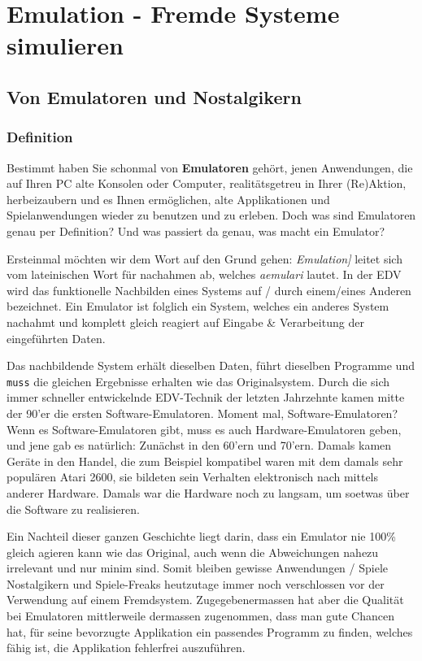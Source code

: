 \documentclass[b5paper,10pt,dvips,fleqn,titlepage,twoside]{book}
\begin{document}
\part{Emulation - Fremde Systeme simulieren}
\chapter{Von Emulatoren und Nostalgikern}
\section{Definition}
Bestimmt haben Sie schonmal von \textbf{Emulatoren} gehört, jenen Anwendungen, die auf Ihren PC alte Konsolen oder Computer, realitätsgetreu in Ihrer (Re)Aktion, herbeizaubern und es Ihnen ermöglichen, alte Applikationen und Spielanwendungen wieder zu benutzen und zu erleben. Doch was sind Emulatoren genau per Definition? Und was passiert da genau, was macht ein Emulator?\newline

Ersteinmal möchten wir dem Wort auf den Grund gehen: \emph{Emulation]} leitet sich vom lateinischen Wort für nachahmen ab, welches \emph{aemulari} lautet.
In der EDV wird das funktionelle Nachbilden eines Systems auf / durch einem/eines Anderen bezeichnet. Ein Emulator ist folglich ein System, welches ein anderes System nachahmt und komplett gleich reagiert auf Eingabe \& Verarbeitung der eingeführten Daten.

Das nachbildende System erhält dieselben Daten, führt dieselben Programme und \texttt{muss} die gleichen Ergebnisse erhalten wie das Originalsystem. Durch die sich immer schneller entwickelnde EDV-Technik der letzten Jahrzehnte kamen mitte der 90'er die ersten Software-Emulatoren. Moment mal, Software-Emulatoren? Wenn es Software-Emulatoren gibt, muss es auch Hardware-Emulatoren geben, und jene gab es natürlich: Zunächst in den 60'ern und 70'ern. Damals kamen Geräte in den Handel, die zum Beispiel kompatibel waren mit dem damals sehr populären Atari 2600, sie bildeten sein Verhalten elektronisch nach mittels anderer Hardware. Damals war die Hardware noch zu langsam, um soetwas über die Software zu realisieren.

Ein Nachteil dieser ganzen Geschichte liegt darin, dass ein Emulator nie 100\% gleich agieren kann wie das Original, auch wenn die Abweichungen nahezu irrelevant und nur minim sind. Somit bleiben gewisse Anwendungen / Spiele Nostalgikern und Spiele-Freaks heutzutage immer noch verschlossen vor der Verwendung auf einem Fremdsystem. Zugegebenermassen hat aber die Qualität bei Emulatoren mittlerweile dermassen zugenommen, dass man gute Chancen hat, für seine bevorzugte Applikation ein passendes Programm zu finden, welches fähig ist, die Applikation fehlerfrei auszuführen.
\end{document}

